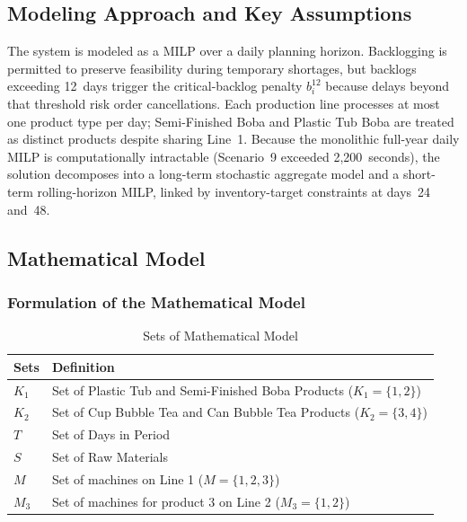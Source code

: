 \documentclass[11pt]{article}
\begin{document}
\subsection{Modeling Approach and Key Assumptions}

The system is modeled as a MILP over a daily planning horizon. Backlogging is permitted to preserve feasibility during temporary shortages, but backlogs exceeding 12~days trigger the critical-backlog penalty $b_i^{12}$ because delays beyond that threshold risk order cancellations. Each production line processes at most one product type per day; Semi-Finished Boba and Plastic Tub Boba are treated as distinct products despite sharing Line~1. Because the monolithic full-year daily MILP is computationally intractable (Scenario~9 exceeded 2,200~seconds), the solution decomposes into a long-term stochastic aggregate model and a short-term rolling-horizon MILP, linked by inventory-target constraints at days~24 and~48.


\subsection{Mathematical Model}

\subsubsection{Formulation of the Mathematical Model}
\label{subsubsec:math_formulation}
\begin{table}[h!]
\centering
\caption{Sets of Mathematical Model}
\begin{tabular}{@{}lp{11cm}@{}}
\toprule
\textbf{Sets}& \textbf{Definition} \\
\midrule
$K_1$& Set of Plastic Tub and Semi-Finished Boba Products ($K_1=\{1,2\}$)\\
$K_2$& Set of Cup Bubble Tea and Can Bubble Tea Products ($K_2=\{3,4\}$)\\
$T$& Set of Days in Period\\
$S$& Set of Raw Materials\\
$M$& Set of machines on Line 1 ($M=\{1,2,3\}$)\\
$M_3$& Set of machines for product 3 on Line 2 ($M_3=\{1,2\}$)\\
\bottomrule
\end{tabular}
\end{table}
\end{document}
